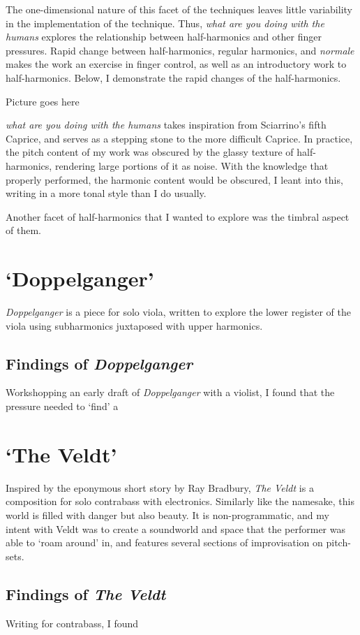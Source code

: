 The one-dimensional nature of this facet of the techniques leaves little variability in the implementation of the technique. 
Thus, \emph{what are you doing with the humans} explores the relationship between half-harmonics and other finger pressures. 
Rapid change between half-harmonics, regular harmonics, and \emph{normale} makes the work an exercise in finger control, as well as an introductory work to half-harmonics.
Below, I demonstrate the rapid changes of the half-harmonics.

Picture goes here

\emph{what are you doing with the humans} takes inspiration from Sciarrino's fifth Caprice, and serves as a stepping stone to the more difficult Caprice.\autocite[]{sciarrinoCapricciViolino1976} 
In practice, the pitch content of my work was obscured by the glassy texture of half-harmonics, rendering large portions of it as noise. 
With the knowledge that properly performed, the harmonic content would be obscured, I leant into this, writing in a more tonal style than I do usually.


Another facet of half-harmonics that I wanted to explore was the timbral aspect of them.

\section{`Doppelganger'}
\emph{Doppelganger} is a piece for solo viola, written to explore the lower register of the viola using subharmonics juxtaposed with upper harmonics. 

\subsection{Findings of \emph{Doppelganger}}
Workshopping an early draft of \emph{Doppelganger} with a violist, I found that the pressure needed to `find' a  \lipsum[3]

\section{`The Veldt'}
Inspired by the eponymous short story by Ray Bradbury, \textit{The Veldt} is a composition for solo contrabass with electronics. 
Similarly like the namesake, this world is filled with danger but also beauty. 
It is non-programmatic, and my intent with Veldt was to create a soundworld and space that the performer was able to `roam around' in, and features several sections of improvisation on pitch-sets. \lipsum[1]

\subsection{Findings of \emph{The Veldt}}
Writing for contrabass, I found 
